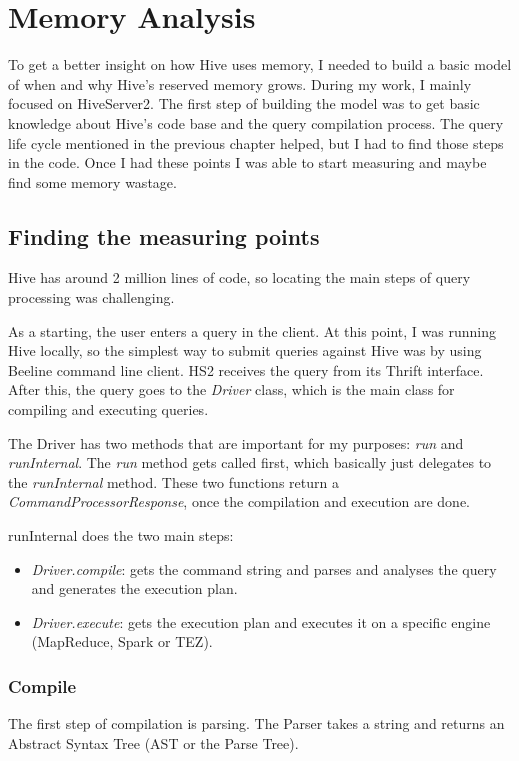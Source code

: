 \chapter{Memory Analysis}
To get a better insight on how Hive uses memory, I needed to build a basic model of when and why Hive's reserved memory grows. During my work, I mainly focused on HiveServer2. The first step of building the model was to get basic knowledge about Hive's code base and the query compilation process. The query life cycle mentioned in the previous chapter helped, but I had to find those steps in the code. Once I had these points I was able to start measuring and maybe find some memory wastage.

\section{Finding the measuring points}
Hive has around 2 million lines of code, so locating the main steps of query processing was challenging. 

As a starting, the user enters a query in the client. At this point, I was running Hive locally, so the simplest way to submit queries against Hive was by using Beeline command line client. HS2 receives the query from its Thrift interface. After this, the query goes to the \textit{Driver} class, which is the main class for compiling and executing queries.

The Driver has two methods that are important for my purposes: \textit{run} and \textit{runInternal}. The \textit{run} method gets called first, which basically just delegates to the \textit{runInternal} method. These two functions return a \textit{CommandProcessorResponse}, once the compilation and execution are done. 

\noindent runInternal does the two main steps:
\begin{itemize}
	\item \textit{Driver.compile}: gets the command string and parses and analyses the query and generates the execution plan.
	\item \textit{Driver.execute}: gets the execution plan and executes it on a specific engine (MapReduce, Spark or TEZ).
\end{itemize}

\subsection{Compile}
The first step of compilation is parsing. The Parser takes a string and returns an Abstract Syntax Tree (AST or the Parse Tree).

